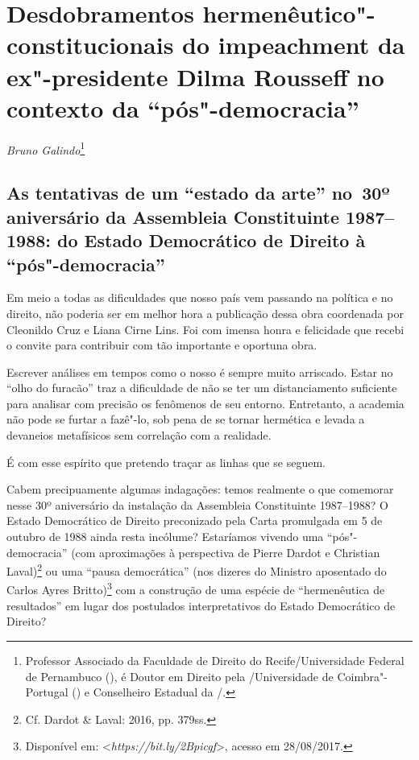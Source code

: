 \chapter*{Desdobramentos hermenêutico"-constitucionais do
impeachment da ex"-presidente Dilma Rousseff no contexto da
``pós"-democracia''}


\begin{flushright}
\emph{Bruno Galindo}\footnote{Professor Associado da Faculdade de Direito do Recife/Universidade
Federal de Pernambuco (), é
Doutor em Direito pela /Universidade de Coimbra"-Portugal
() e Conselheiro Estadual da /.}
\end{flushright}


 \section{As tentativas de um ``estado da arte'' no~30º aniversário da
  Assembleia Constituinte 1987--1988: do Estado Democrático de Direito à
  ``pós"-democracia''}


Em meio a todas as dificuldades que nosso país vem passando na política
e no direito, não poderia ser em melhor hora a publicação dessa obra
coordenada por Cleonildo Cruz e Liana Cirne Lins. Foi com imensa honra e
felicidade que recebi o convite para contribuir com tão importante e
oportuna obra.

Escrever análises em tempos como o nosso é sempre muito arriscado. Estar
no ``olho do furacão'' traz a dificuldade de não se ter um
distanciamento suficiente para analisar com precisão os fenômenos de seu
entorno. Entretanto, a academia não pode se furtar a fazê"-lo, sob pena
de se tornar hermética e levada a devaneios metafísicos sem correlação
com a realidade.

É com esse espírito que pretendo traçar as linhas que se seguem.

Cabem precipuamente algumas indagações: temos realmente o que comemorar
nesse 30º aniversário da instalação da Assembleia Constituinte
1987--1988? O Estado Democrático de Direito preconizado pela Carta
promulgada em 5 de outubro de 1988 ainda resta incólume? Estaríamos
vivendo uma ``pós"-democracia'' (com aproximações à perspectiva de Pierre
Dardot e Christian Laval)\footnote{Cf. Dardot \& Laval: 2016, pp. 379ss.} ou
uma ``pausa democrática'' (nos dizeres do Ministro aposentado do 
Carlos Ayres Britto)\footnote{Disponível em: \textless{}\emph{https://bit.ly/2Bpicgf}\textgreater{},
  acesso em 28/08/2017.} com a construção de uma espécie de
``hermenêutica de resultados'' em lugar dos postulados interpretativos
do Estado Democrático de Direito?

